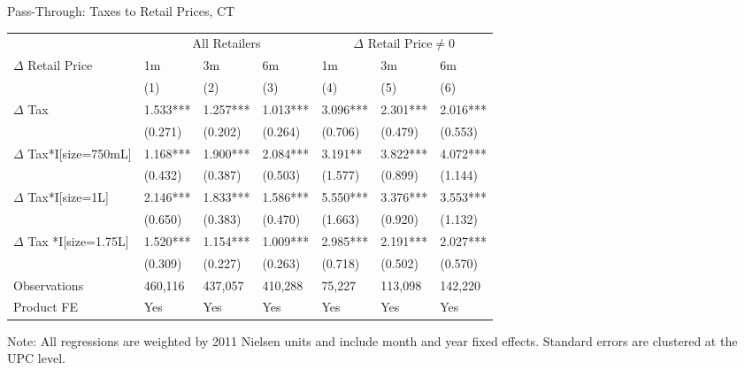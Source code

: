 \begin{frame}{Pass-Through:  Taxes to Retail Prices, CT}
\tiny
\begin{table}[htp]
\begin{center}
\begin{tabular}{l l l l l l l } \hline
& \multicolumn{3}{c}{All Retailers} & \multicolumn{3}{c}{$\Delta$ Retail Price$ \neq 0$} \\ 
 $\Delta$ Retail Price & 1m & 3m & 6m & 1m & 3m & 6m \\   
 & (1) & (2) & (3) & (4) & (5) & (6)  \\  
\hline
$\Delta$ Tax & 1.533*** & 1.257*** & 1.013*** & 3.096*** & 2.301*** & 2.016*** \\
& (0.271) & (0.202) & (0.264) & (0.706) & (0.479) & (0.553) \\ \hline
$\Delta$ Tax*I[size=750mL] & 1.168*** & 1.900*** & 2.084*** & 3.191** & 3.822*** & 4.072*** \\
& (0.432) & (0.387) & (0.503) & (1.577) & (0.899) & (1.144) \\
$\Delta$ Tax*I[size=1L] & 2.146*** & 1.833*** & 1.586*** & 5.550*** & 3.376*** & 3.553*** \\
& (0.650) & (0.383) & (0.470) & (1.663) & (0.920) & (1.132) \\
$\Delta$ Tax *I[size=1.75L]  & 1.520*** & 1.154*** & 1.009*** & 2.985*** & 2.191*** & 2.027*** \\
& (0.309) & (0.227) & (0.263) & (0.718) & (0.502) & (0.570) \\ \hline
Observations & 460,116 & 437,057 & 410,288 & 75,227 & 113,098 & 142,220\\
Product FE & Yes & Yes & Yes & Yes & Yes & Yes \\  \hline
\end{tabular}
\end{center}
\begin{tablenotes}
\footnotesize \item \tiny Note: All regressions are weighted by 2011 Nielsen units and include month and year fixed effects. Standard errors are clustered at the UPC level.
\end{tablenotes}
\end{table}
\end{frame}



